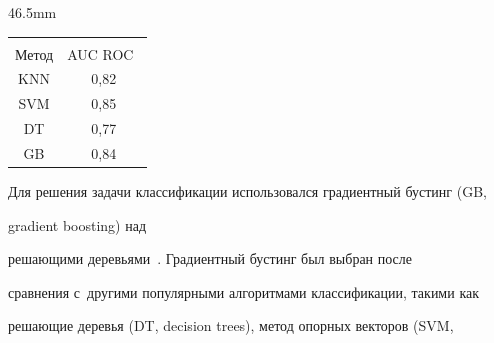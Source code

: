 \begin{floatingfigure}{46.5mm}

{\small %

\vspace*{-12pt}

\begin{center}


\vspace*{2ex}



\tabcolsep=8.9pt

\begin{tabular}{|c|c|}

\hline

&\\[-9pt]

Метод& AUC ROC~\cite{11-o}\\

\hline

KNN&0,82\\

SVM&0,85\\

DT&0,77\\

GB&0,84\\

\hline

\end{tabular}

\end{center}}

\end{floatingfigure}




\renewcommand{\figurename}{\protect\bf Рис.}

\renewcommand{\tablename}{\protect\bf Таблица}





  Для решения задачи классификации использовался градиентный бустинг (GB,

  gradient boosting) над 

решающими деревьями~\cite{10-o}. Градиентный бустинг был выбран после 

сравнения с~другими популярными алгоритмами классификации, такими как 

ре\-ша\-ющие деревья (DT, decision trees), метод опорных векторов (SVM,

